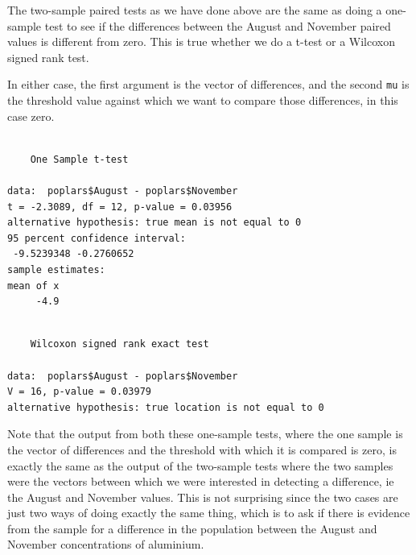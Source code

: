 \documentclass[
  letterpaper,
  DIV=11,
  numbers=noendperiod]{scrreprt}
\newenvironment{Shaded}{\begin{snugshade}}{\end{snugshade}}
\newcommand{\AttributeTok}[1]{\textcolor[rgb]{0.40,0.45,0.13}{#1}}
\newcommand{\DecValTok}[1]{\textcolor[rgb]{0.68,0.00,0.00}{#1}}
\newcommand{\FunctionTok}[1]{\textcolor[rgb]{0.28,0.35,0.67}{#1}}
\newcommand{\NormalTok}[1]{\textcolor[rgb]{0.00,0.23,0.31}{#1}}
\newcommand{\SpecialCharTok}[1]{\textcolor[rgb]{0.37,0.37,0.37}{#1}}
\begin{document}
The two-sample paired tests as we have done above are the same as doing
a one-sample test to see if the differences between the August and
November paired values is different from zero. This is true whether we
do a t-test or a Wilcoxon signed rank test.

In either case, the first argument is the vector of differences, and the
second \texttt{mu} is the threshold value against which we want to
compare those differences, in this case zero.

\begin{Shaded}
\end{Shaded}

\begin{verbatim}

    One Sample t-test

data:  poplars$August - poplars$November
t = -2.3089, df = 12, p-value = 0.03956
alternative hypothesis: true mean is not equal to 0
95 percent confidence interval:
 -9.5239348 -0.2760652
sample estimates:
mean of x 
     -4.9 
\end{verbatim}

\begin{Shaded}
\end{Shaded}

\begin{verbatim}

    Wilcoxon signed rank exact test

data:  poplars$August - poplars$November
V = 16, p-value = 0.03979
alternative hypothesis: true location is not equal to 0
\end{verbatim}

Note that the output from both these one-sample tests, where the one
sample is the vector of differences and the threshold with which it is
compared is zero, is exactly the same as the output of the two-sample
tests where the two samples were the vectors between which we were
interested in detecting a difference, ie the August and November values.
This is not surprising since the two cases are just two ways of doing
exactly the same thing, which is to ask if there is evidence from the
sample for a difference in the population between the August and
November concentrations of aluminium.
\end{document}
